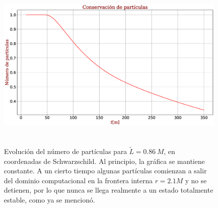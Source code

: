 \documentclass[11pt,twoside,openright,spanish]{report}
\numberwithin{equation}{chapter}
\numberwithin{figure}{chapter}
\numberwithin{table}{chapter}
\begin{document}
\begin{figure}[H]
	\centering
	\includegraphics[height=8.5cm]{graphs_study/LmenorSchGraphs/numpartSchMenor.eps}
	\caption{Evolución del número de partículas para $\tilde{L}=0.86\ M$, en coordenadas de Schwarzschild. Al principio, la gráfica se mantiene constante. A un cierto tiempo algunas partículas comienzan a salir del dominio computacional en la frontera interna $r=2.1 M$ y no se detienen, por lo que nunca se llega realmente a un estado totalmente estable, como ya se mencionó.}
	\label{numpartSchmenor}
\end{figure}
\end{document}

